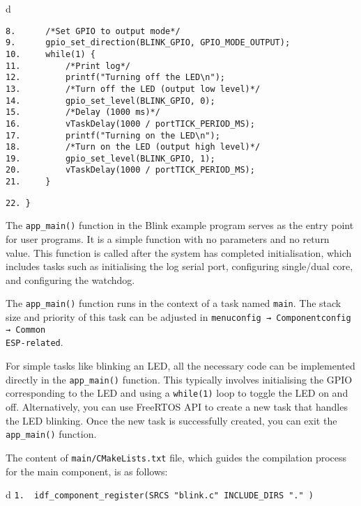 \documentclass[a4paper,12pt]{book}
\begin{document}
\begin{codebloc}
\begin{tabular}{d}
\vspace{2pt}
\begin{verbatim}
8.      /*Set GPIO to output mode*/
9.      gpio_set_direction(BLINK_GPIO, GPIO_MODE_OUTPUT);
10.     while(1) {
11.         /*Print log*/
12.         printf("Turning off the LED\n");
13.         /*Turn off the LED (output low level)*/
14.         gpio_set_level(BLINK_GPIO, 0);
15.         /*Delay (1000 ms)*/
16.         vTaskDelay(1000 / portTICK_PERIOD_MS);
17.         printf("Turning on the LED\n");
18.         /*Turn on the LED (output high level)*/
19.         gpio_set_level(BLINK_GPIO, 1);
20.         vTaskDelay(1000 / portTICK_PERIOD_MS);
21.     }
\end{verbatim}
\verb|22. }|
\end{tabular}
\end{codebloc}

The \verb|app_main()| function in the Blink example program serves as the entry point for user programs. It is a simple function with no parameters and no return value. This function is called after the system has completed initialisation, which includes tasks such as initialising the log serial port, configuring single/dual core, and configuring the watchdog.

The \verb|app_main()| function runs in the context of a task named \verb|main|. The stack size and priority of this task can be adjusted in \verb|menuconfig → Componentconfig → Common |\\ \verb|ESP-related|.

For simple tasks like blinking an LED, all the necessary code can be implemented directly in the \verb|app_main()| function. This typically involves initialising the GPIO corresponding to the LED and using a \verb|while(1)| loop to toggle the LED on and off. Alternatively, you can use FreeRTOS API to create a new task that handles the LED blinking. Once the new task is successfully created, you can exit the \verb|app_main()| function.

The content of \verb|main/CMakeLists.txt| file, which guides the compilation process for the main component, is as follows:

\begin{codebloc}
\begin{tabular}{d}
\verb|1.  idf_component_register(SRCS "blink.c" INCLUDE_DIRS "." )|
\end{tabular}
\end{codebloc}
\end{document}
